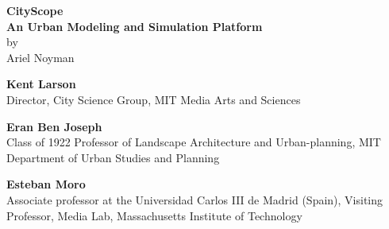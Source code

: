 \begin{titlepage}
    \begin{large}
        {\huge\textbf{CityScope}\bigskip}
        \\\textbf{An Urban Modeling and Simulation Platform}
        \\\bigskip
        by\\\bigskip
        Ariel Noyman

        \signature{Thesis Advisor}
        {
            \textbf{Kent Larson}
            \\
            Director, City Science Group,
            MIT Media Arts and Sciences
        }

        \signature{Thesis Reader}
        {
            \textbf{Eran Ben Joseph}
            \\
            Class of 1922 Professor of Landscape Architecture and Urban-planning,
            MIT Department of Urban Studies and Planning
        }

        \signature{Thesis Reader}
        {
            \textbf{Esteban Moro}
            \\
            Associate professor at the Universidad Carlos III de Madrid (Spain),
            Visiting Professor, Media Lab, Massachusetts Institute of Technology
        }
    \end{large}
\end{titlepage}



